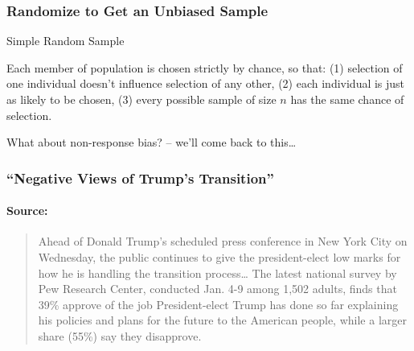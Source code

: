 \begin{frame}
\frametitle{Randomize to Get an Unbiased Sample}

\begin{block}{Simple Random Sample}

Each member of population is chosen strictly by chance, so that: (1) selection of one individual doesn't influence selection of any other, (2) each individual is just as likely to be chosen, (3) every possible sample of size $n$ has the same chance of selection.

\end{block}

\begin{block}{What about non-response bias? -- we'll come back to this\dots}
\end{block}
\end{frame}
\begin{frame}
  \frametitle{``Negative Views of Trump's Transition''}
  \framesubtitle{Source: \href{http://www.people-press.org/2017/01/10/negative-views-of-trumps-transition-amid-concerns-about-conflicts-tax-returns/}{}}
  \begin{quote}
Ahead of Donald Trump's scheduled press conference in New York City on Wednesday, the public continues to give the president-elect low marks for how he is handling the transition process\dots 
The latest national survey by Pew Research Center, conducted Jan. 4-9 among 1,502 adults, finds that 39\% approve of the job President-elect Trump has done so far explaining his policies and plans for the future to the American people, while a larger share (55\%) say they disapprove.
  \end{quote}
\end{frame}
%
